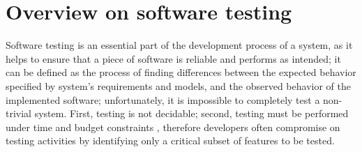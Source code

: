 \section{Overview on software testing}
Software testing is an essential part of the development process of a system, as it helps to ensure that a piece of software is reliable and performs as intended; it can be defined as the process of finding differences between the expected behavior specified by system's requirements and models, and the observed behavior of the implemented software; unfortunately, it is impossible to completely test a non-trivial system. First, testing is not decidable; second, testing must be performed under time and budget constraints \cite{OOSE}, therefore developers often compromise on testing activities by identifying only a critical subset of features to be tested.

